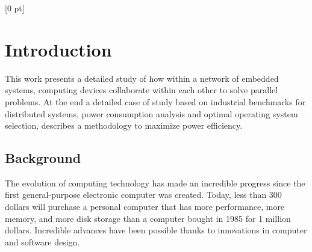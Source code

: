 
 
\titlespacing{\chapter}{0 pt}{30 pt}{50 pt}[0 pt]
\titleformat{\section}{\Large\bfseries}{\thesection}{0 pt}{\hspace{30 pt}}
\titleformat{\subsection}{\large\bfseries}{\thesubsection}{0 pt}{\hspace{30
pt}} \pagestyle{fancy} \fancyhead[LO,LE]{\footnotesize\textit{\leftmark}}
\fancyhead[RO,RE]{\thepage} \fancyfoot[CO,CE]{}

\chapter{Introduction} %

\normalsize This work presents a detailed study of how within a network of
embedded systems, computing devices collaborate within each other to solve
parallel problems. At the end a detailed case of study based on industrial
benchmarks for distributed systems, power consumption analysis and optimal
operating system selection, describes a methodology to maximize power
efficiency.

\section{Background} \vspace{30 pt} \noindent

The evolution of computing technology has made an incredible progress since the
first general-purpose electronic computer was created. Today, less than 300
dollars will purchase a personal computer that has more performance, more
memory, and more disk storage than a computer bought in 1985 for 1 million
dollars\cite{Hennessy}. Incredible advances have been possible thanks to
innovations in computer and software design. 


